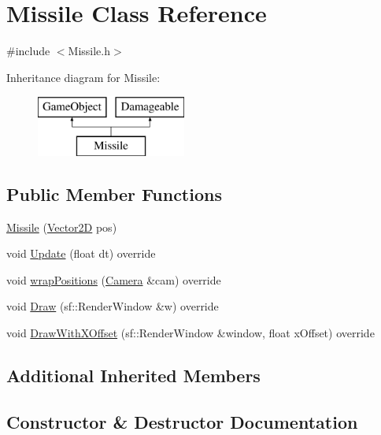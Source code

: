 \hypertarget{class_missile}{}\section{Missile Class Reference}
\label{class_missile}


{\ttfamily \#include $<$Missile.\+h$>$}

Inheritance diagram for Missile\+:\begin{figure}[H]
\begin{center}
\leavevmode
\includegraphics[height=2.000000cm]{class_missile}
\end{center}
\end{figure}
\subsection*{Public Member Functions}
\begin{DoxyCompactItemize}
\item 
\hyperlink{class_missile_acfe995db0f81c5bc53b6683d0081ab70}{Missile} (\hyperlink{class_vector2_d}{Vector2D} pos)
\item 
void \hyperlink{class_missile_a75c5c4613f289d4d0ad806743e7d40f7}{Update} (float dt) override
\item 
void \hyperlink{class_missile_ae4d7aa6babf40ea774097bfa0f7c9ff7}{wrap\+Positions} (\hyperlink{class_camera}{Camera} \&cam) override
\item 
void \hyperlink{class_missile_ae80d48e796f506e03e632122f62ae230}{Draw} (sf\+::\+Render\+Window \&w) override
\item 
void \hyperlink{class_missile_a51c591552a2faedc78c524ea8ed3d770}{Draw\+With\+X\+Offset} (sf\+::\+Render\+Window \&window, float x\+Offset) override
\end{DoxyCompactItemize}
\subsection*{Additional Inherited Members}


\subsection{Constructor \& Destructor Documentation}
\hypertarget{class_missile_acfe995db0f81c5bc53b6683d0081ab70}{}\label{class_missile_acfe995db0f81c5bc53b6683d0081ab70} 
